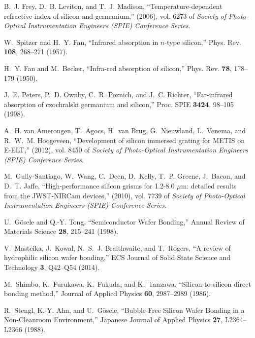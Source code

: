 \documentclass[osajnl,twocolumn,showpacs,superscriptaddress,11pt]{revtex4-1} %
\begin{document}
\begin{thebibliography}{10}
\newcommand{\enquote}[1]{``#1''}

B.~J. {Frey}, D.~B. {Leviton}, and T.~J. {Madison},
  \enquote{{Temperature-dependent refractive index of silicon and germanium},}
  (2006), vol. 6273 of \emph{Society of Photo-Optical Instrumentation Engineers
  (SPIE) Conference Series}.

W.~Spitzer and H.~Y. Fan, \enquote{Infrared absorption in $n$-type silicon,}
  Phys. Rev. \textbf{108}, 268--271 (1957).

H.~Y. Fan and M.~Becker, \enquote{Infra-red absorption of silicon,} Phys. Rev.
  \textbf{78}, 178--179 (1950).

J.~E. Peters, P.~D. Ownby, C.~R. Poznich, and J.~C. Richter,
  \enquote{Far-infrared absorption of czochralski germanium and silicon,} Proc. SPIE
  \textbf{3424}, 98--105 (1998).

A.~H. {van Amerongen}, T.~{Agocs}, H.~{van Brug}, G.~{Nieuwland}, L.~{Venema},
  and R.~W.~M. {Hoogeveen}, \enquote{{Development of silicon immersed grating
  for METIS on E-ELT},}  (2012), vol. 8450 of \emph{Society of Photo-Optical
  Instrumentation Engineers (SPIE) Conference Series}.

M.~{Gully-Santiago}, W.~{Wang}, C.~{Deen}, D.~{Kelly}, T.~P. {Greene},
  J.~{Bacon}, and D.~T. {Jaffe}, \enquote{{High-performance silicon grisms for
  1.2-8.0 {$\mu$}m: detailed results from the JWST-NIRCam devices},}  (2010),
  vol. 7739 of \emph{Society of Photo-Optical Instrumentation Engineers (SPIE)
  Conference Series}.

U.~{G{\"o}sele} and Q.-Y. {Tong}, \enquote{{Semiconductor Wafer Bonding},}
  Annual Review of Materials Science \textbf{28}, 215--241 (1998).

V.~Masteika, J.~Kowal, N.~S.~J. Braithwaite, and T.~Rogers, \enquote{A review
  of hydrophilic silicon wafer bonding,} {ECS} Journal of Solid State Science
  and Technology \textbf{3}, Q42--Q54 (2014).

M.~{Shimbo}, K.~{Furukawa}, K.~{Fukuda}, and K.~{Tanzawa},
  \enquote{{Silicon-to-silicon direct bonding method},} Journal of Applied
  Physics \textbf{60}, 2987--2989 (1986).

R.~{Stengl}, K.-Y. {Ahn}, and U.~{G{\"o}sele}, \enquote{{Bubble-Free Silicon
  Wafer Bonding in a Non-Cleanroom Environment},} Japanese Journal of Applied
  Physics \textbf{27}, L2364--L2366 (1988).


\end{thebibliography}
\end{document}
